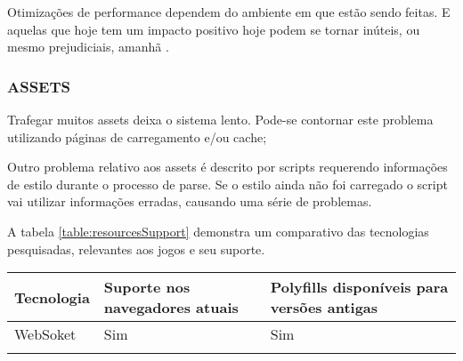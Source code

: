 Otimizações de performance dependem do ambiente em que estão
sendo feitas. E aquelas que hoje tem um impacto positivo hoje
podem se tornar inúteis, ou mesmo prejudiciais, amanhã
\autocite[pp.131]{html5mostwanted}.

\subsubsection{ASSETS}

Trafegar muitos assets deixa o sistema lento. Pode-se contornar este
problema utilizando páginas de carregamento e/ou cache;

Outro problema relativo aos assets é descrito por \cite{howBrowsersWork}
scripts requerendo informações de estilo durante o processo de
parse. Se o estilo ainda não foi carregado o script vai utilizar
informações erradas, causando uma série de problemas.


A tabela \ref{table:resourcesSupport} demonstra um comparativo das tecnologias
pesquisadas, relevantes aos jogos e seu suporte.

\begin{tabular}{ |p{3cm}|p{3cm}|p{3cm}|  }
\hline
Tecnologia & Suporte nos navegadores atuais & Polyfills disponíveis  para versões antigas \\
\hline
WebSoket & Sim & Sim \\
\hline
\label{table:resourcesSupport}
\end{tabular}

